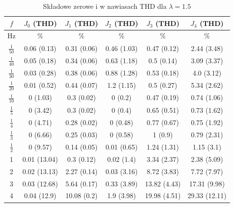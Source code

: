 \documentclass[journal,twoside,web]{ieeecolor}
\begin{document}
\begin{table}[h!]
	\centering
	\renewcommand{\arraystretch}{1.2}
	\caption{Składowe zerowe i w nawiasach THD dla $\lambda = 1.5$}
	\setlength{\tabcolsep}{6pt}
	\begin{tabular}{|c|c|c|c|c|c|}
		\hline
		$f$              & $J_0$ (THD)       & $J_1$ (THD)       & $J_2$ (THD)            & $J_3$ (THD)       & $J_4$ (THD)       \\ \hline
		Hz & \% & \% & \% & \% & \% \\ \hline
		\(\frac{1}{50}\) & 0.06 (0.13)     & 0.31 (0.06)     & 0.46 (1.03)     & 0.47 (0.12)     & 2.44 (3.48)     \\ \hline
		\(\frac{1}{40}\) & 0.05 (0.18)     & 0.34 (0.06)     & 0.63 (1.18)     & 0.5 (0.14)      & 3.09 (3.37)     \\ \hline
		\(\frac{1}{30}\) & 0.03 (0.28)     & 0.38 (0.06)     & 0.88 (1.28)     & 0.53 (0.18)     & 4.0 (3.12)      \\ \hline
		\(\frac{1}{20}\) & 0.01 (0.52)     & 0.44 (0.07)     & 1.2 (1.15)      & 0.5 (0.27)      & 5.34 (2.62)     \\ \hline
		\(\frac{1}{10}\) & 0 (1.03)        & 0.3 (0.02)      & 0 (0.2)        & 0.47 (0.19)     & 0.74 (1.06)     \\ \hline
		\(\frac{1}{5}\)  & 0 (3.42)        & 0.3 (0.02)      & 0 (0.4)        & 0.65 (0.51)     & 0.73 (1.62)     \\ \hline
		\(\frac{1}{4}\)  & 0 (4.71)        & 0.28 (0.02)     & 0 (0.48)       & 0.77 (0.67)     & 0.75 (1.92)     \\ \hline
		\(\frac{1}{3}\)  & 0 (6.66)        & 0.25 (0.03)     & 0 (0.58)       & 1 (0.9)         & 0.79 (2.31)     \\ \hline
		\(\frac{1}{2}\)  & 0 (9.57)        & 0.14 (0.05)     & 0.01 (0.65)    & 1.24 (1.31)     & 1.15 (3.1)      \\ \hline
		1                & 0.01 (13.04)    & 0.3 (0.12)      & 0.02 (1.4)     & 3.34 (2.37)     & 2.38 (5.09)     \\ \hline
		2                & 0.02 (13.13)    & 2.27 (0.14)     & 0.03 (3.16)    & 8.72 (3.83)     & 7.72 (7.97)     \\ \hline
		3                & 0.03 (12.68)    & 5.64 (0.17)     & 0.33 (3.89)    & 13.82 (4.43)    & 17.31 (9.98)    \\ \hline
		4                & 0.04 (12.9)     & 10.08 (0.2)     & 1.9 (3.98)     & 19.98 (4.51)    & 29.33 (12.11)   \\ \hline
	\end{tabular}
	
	\label{tab:THDL15}
\end{table}
\end{document}
